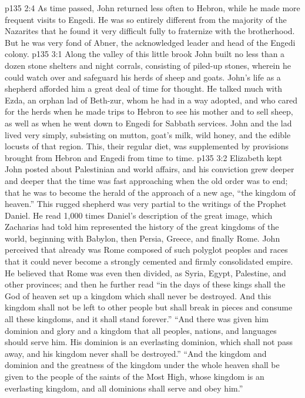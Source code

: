 \vs p135 2:4 As time passed, John returned less often to Hebron, while he made more frequent visits to Engedi. He was so entirely different from the majority of the Nazarites that he found it very difficult fully to fraternize with the brotherhood. But he was very fond of Abner, the acknowledged leader and head of the Engedi colony.
\vs p135 3:1 Along the valley of this little brook John built no less than a dozen stone shelters and night corrals, consisting of piled\hyp{}up stones, wherein he could watch over and safeguard his herds of sheep and goats. John’s life as a shepherd afforded him a great deal of time for thought. He talked much with Ezda, an orphan lad of Beth\hyp{}zur, whom he had in a way adopted, and who cared for the herds when he made trips to Hebron to see his mother and to sell sheep, as well as when he went down to Engedi for Sabbath services. John and the lad lived very simply, subsisting on mutton, goat’s milk, wild honey, and the edible locusts of that region. This, their regular diet, was supplemented by provisions brought from Hebron and Engedi from time to time.
\vs p135 3:2 \pc Elizabeth kept John posted about Palestinian and world affairs, and his conviction grew deeper and deeper that the time was fast approaching when the old order was to end; that he was to become the herald of the approach of a new age, “the kingdom of heaven.” This rugged shepherd was very partial to the writings of the Prophet Daniel. He read 1,000 times Daniel’s description of the great image, which Zacharias had told him represented the history of the great kingdoms of the world, beginning with Babylon, then Persia, Greece, and finally Rome. John perceived that already was Rome composed of such polyglot peoples and races that it could never become a strongly cemented and firmly consolidated empire. He believed that Rome was even then divided, as Syria, Egypt, Palestine, and other provinces; and then he further read “in the days of these kings shall the God of heaven set up a kingdom which shall never be destroyed. And this kingdom shall not be left to other people but shall break in pieces and consume all these kingdoms, and it shall stand forever.” “And there was given him dominion and glory and a kingdom that all peoples, nations, and languages should serve him. His dominion is an everlasting dominion, which shall not pass away, and his kingdom never shall be destroyed.” “And the kingdom and dominion and the greatness of the kingdom under the whole heaven shall be given to the people of the saints of the Most High, whose kingdom is an everlasting kingdom, and all dominions shall serve and obey him.”
